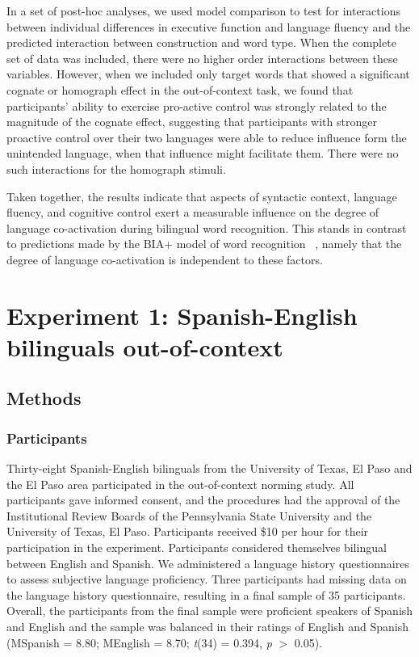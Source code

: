 In a set of post-hoc analyses, we used model comparison to test for interactions between individual differences in executive function and language fluency and the predicted interaction between construction and word type. When the complete set of data was included, there were no higher order interactions between these variables. However, when we included only target words that showed a significant cognate or homograph effect in the out-of-context task, we found that participants' ability to exercise pro-active control was strongly related to the magnitude of the cognate effect, suggesting that participants with stronger proactive control over their two languages were able to reduce influence form the unintended language, when that influence might facilitate them. There were no such interactions for the homograph stimuli.

Taken together, the results indicate that aspects of syntactic context, language fluency, and cognitive control exert a measurable influence on the degree of language co-activation during bilingual word recognition. This stands in contrast to predictions made by the BIA+ model of word recognition ~\citep[BIA+;][]{Dijkstra2002}, namely that the degree of language co-activation is independent to these factors.

\section{Experiment 1: Spanish-English bilinguals out-of-context}
\label{experiment1:spanish-englishbilingualsout-of-context}

\subsection{Methods}
\label{methods}

\subsubsection{Participants}
\label{participants}

Thirty-eight Spanish-English bilinguals from the University of Texas, El Paso and the El Paso area participated in the out-of-context norming study. All participants gave informed consent, and the procedures had the approval of the Institutional Review Boards of the Pennsylvania State University and the University of Texas, El Paso. Participants received \$10 per hour for their participation in the experiment. Participants considered themselves bilingual between English and Spanish. We administered a language history questionnaires to assess subjective language proficiency. Three participants had missing data on the language history questionnaire, resulting in a final sample of 35 participants. Overall, the participants from the final sample were proficient speakers of Spanish and English and the sample was balanced in their ratings of English and Spanish (MSpanish = 8.80; MEnglish = 8.70; \emph{t}(34) = 0.394, \emph{p} $>$ 0.05).

